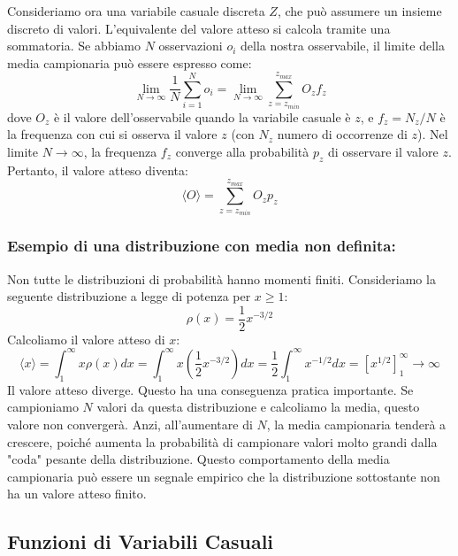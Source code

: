 Consideriamo ora una variabile casuale discreta $Z$, che può assumere un insieme discreto di valori. L'equivalente del valore atteso si calcola tramite una sommatoria. Se abbiamo $N$ osservazioni $o_i$ della nostra osservabile, il limite della media campionaria può essere espresso come:
\begin{equation}
\lim_{N \to \infty} \frac{1}{N} \sum_{i=1}^N o_i = \lim_{N \to \infty} \sum_{z=z_{min}}^{z_{max}} O_z f_z
\end{equation}
dove $O_z$ è il valore dell'osservabile quando la variabile casuale è $z$, e $f_z = N_z/N$ è la frequenza con cui si osserva il valore $z$ (con $N_z$ numero di occorrenze di $z$). Nel limite $N \to \infty$, la frequenza $f_z$ converge alla probabilità $p_z$ di osservare il valore $z$. Pertanto, il valore atteso diventa:
\begin{equation}
\langle O \rangle = \sum_{z=z_{min}}^{z_{max}} O_z p_z
\end{equation}

\subsubsection{Esempio di una distribuzione con media non definita:}

Non tutte le distribuzioni di probabilità hanno momenti finiti. Consideriamo la seguente distribuzione a legge di potenza per $x \ge 1$:
\begin{equation}
\rho(x) = \frac{1}{2}x^{-3/2}
\end{equation}
Calcoliamo il valore atteso di $x$:
\begin{equation}
\langle x \rangle = \int_1^\infty x \rho(x) dx = \int_1^\infty x \left(\frac{1}{2}x^{-3/2}\right) dx = \frac{1}{2} \int_1^\infty x^{-1/2} dx = \left[x^{1/2}\right]_1^\infty \to \infty
\end{equation}
Il valore atteso diverge. Questo ha una conseguenza pratica importante. Se campioniamo $N$ valori da questa distribuzione e calcoliamo la media, questo valore non convergerà. Anzi, all'aumentare di $N$, la media campionaria tenderà a crescere, poiché aumenta la probabilità di campionare valori molto grandi dalla "coda" pesante della distribuzione. Questo comportamento della media campionaria può essere un segnale empirico che la distribuzione sottostante non ha un valore atteso finito.

\subsection{Funzioni di Variabili Casuali}

